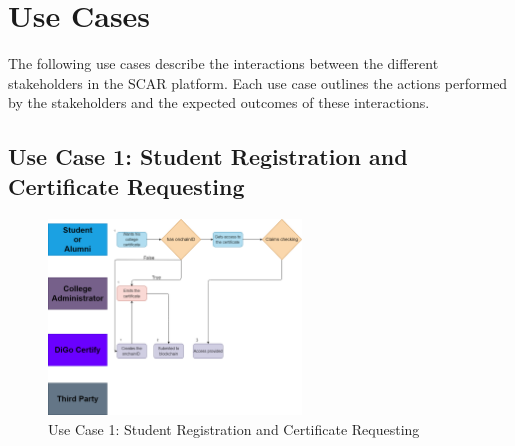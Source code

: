 \section{Use Cases}\label{sec:use-cases}

The following use cases describe the interactions between the different stakeholders in the SCAR platform. Each use case outlines the actions performed by the stakeholders and the expected outcomes of these interactions.

\subsection{Use Case 1: Student Registration and Certificate Requesting}

\begin{figure}[H]
    \centering
    \includegraphics[width=0.6\textwidth, height=0.6\textheight, keepaspectratio]{../diagrams/certificate-requesting.drawio.png}
    \caption{Use Case 1: Student Registration and Certificate Requesting}
    \label{fig:use-case-1}
\end{figure}


